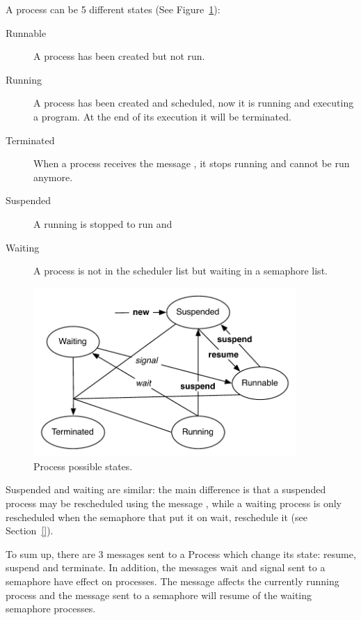 \documentclass[a4paper,10pt,twoside]{book}
\begin{document}
A process can be 5 different states (See Figure~\ref{fig:processState}):
\begin{description}
\item [Runnable] A process has been created but not run. 

\item [Running] A process has been created and  scheduled, now it is running and executing a program. At the end of its execution it will be terminated.

\item [Terminated] When a process receives the message , it stops running and cannot be run anymore. 

\item [Suspended] A running is stopped to run and 

\item [Waiting] A process is not in the scheduler list but waiting in a semaphore list. 

\end{description}


\begin{figure}
\begin{center}
\includegraphics[width=10cm]{ProcessState}
\caption{Process possible states.\label{fig:processState}}
\end{center}
\end{figure}

Suspended and waiting are similar: the main difference is that a suspended process may be rescheduled using the message , while a waiting process is only rescheduled when the semaphore that put it on wait, reschedule it (see Section~\ref{}).

To sum up, there are 3 messages sent to a Process which change its state: resume, suspend and terminate. In addition, the messages wait and signal sent to a semaphore have effect on processes. The message  affects the currently running process and the message  sent to a semaphore will resume of the waiting semaphore processes. 
\end{document}
